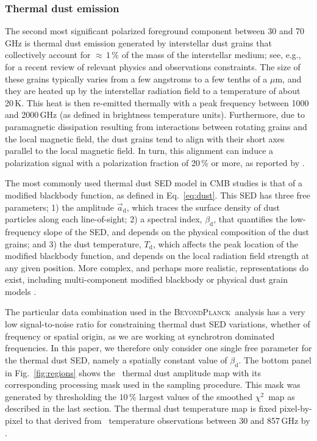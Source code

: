 \documentclass[twocolumn]{aa}
\def\chisq{$\chi^2$}
\renewcommand{\a}[0]{\vec{a}}
\newcommand{\BP}{\textsc{BeyondPlanck}}
\newcommand{\?}[1]{\textcolor{red}{{\bf [#1]}}}
\begin{document}
\subsubsection{Thermal dust emission}

The second most significant polarized foreground component between 30
and 70\,GHz is thermal dust emission generated by interstellar dust
grains that collectively account for $\approx$$\,1\,\%$ of the mass of
the interstellar medium; see, e.g., \citet{hensley2020} for a recent
review of relevant physics and observations constraints. The size of
these grains typically varies from a few angstroms to a few tenths of
a $\mu\mathrm{m}$, and they are heated up by the interstellar
radiation field to a temperature of about 20\,K. This heat is then
re-emitted thermally with a peak frequency between 1000 and 2000\,GHz
(as defined in brightness temperature units). Furthermore, due to
paramagnetic dissipation resulting from interactions between rotating
grains and the local magnetic field, the dust grains tend to align
with their short axes parallel to the local magnetic field. In turn,
this alignment can induce a polarization signal with a polarization
fraction of 20\,\% or more, as reported by \citet{planck2016-l11A}.

The most commonly used thermal dust SED model in CMB studies is that of a modified blackbody
function, as defined in Eq.~\eqref{eq:dust}. This SED has three free
parameters; 1) the amplitude $\a_{\mathrm d}$, which traces the
surface density of dust particles along each line-of-sight; 2) a
spectral index, $\beta_{\mathrm d}$, that quantifies the low-frequency
slope of the SED, and depends on the physical composition of the dust
grains; and 3) the dust temperature, $T_{\mathrm d}$, which affects
the peak location of the modified blackbody function, and depends on
the local radiation field strength at any given position. More
complex, and perhaps more realistic, representations do exist,
including multi-component modified blackbody
\citep[e.g.,][]{finkbeiner1999, meisner2015} or physical dust grain
models \citep[][]{guillet2018}. 

The particular data combination used in the \BP\ analysis has a very low
signal-to-noise ratio for constraining thermal dust SED variations, whether of
frequency or spatial origin, as we are working at synchrotron dominated frequencies.
In this paper, we therefore only consider one single free parameter for the thermal
dust SED, namely a spatially constant value of $\beta_{\mathrm{d}}$. The bottom
panel in Fig.~\ref{fig:regions} shows the \Planck\ thermal dust amplitude map
\citep{planck2016-l04} with its corresponding processing mask used in the
sampling procedure. This mask was generated by thresholding the $10\,\%$ largest
values of the smoothed \chisq\ map as described in the last section.  The thermal
dust temperature map is fixed pixel-by-pixel to that derived from \Planck\
temperature observations between 30 and 857\,GHz by \citet{planck2020-LVII}.
\end{document}
